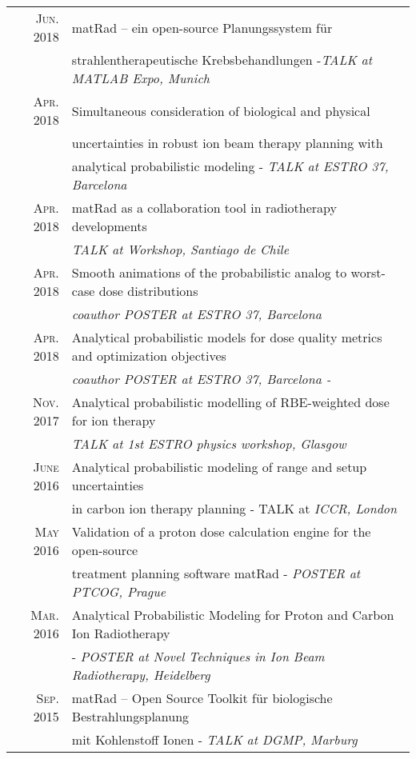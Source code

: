 \documentclass[a4paper,10pt]{article}
\begin{document}
\begin{tabular}{rl}
\textsc{Jun.} 2018 & matRad – ein open-source Planungssystem für \\
& strahlentherapeutische Krebsbehandlungen -\emph{TALK at MATLAB Expo, Munich} \\
\textsc{Apr.} 2018 & Simultaneous consideration of biological and physical \\
& uncertainties in robust ion beam therapy planning with  \\
& analytical probabilistic modeling  - \emph{TALK at ESTRO 37, Barcelona} \\
\textsc{Apr.} 2018 & matRad as a collaboration tool in radiotherapy developments\\
&   \emph{ TALK at Workshop, Santiago de Chile}\\
\textsc{Apr.} 2018 & Smooth animations of the probabilistic analog to worst-case dose distributions\\
&   \emph{coauthor POSTER at ESTRO 37, Barcelona}  \\
\textsc{Apr.} 2018 & Analytical probabilistic models for dose quality metrics and optimization objectives\\
&   \emph{coauthor POSTER at ESTRO 37, Barcelona - }  \\
\textsc{Nov.} 2017 & Analytical probabilistic modelling of RBE-weighted dose for ion therapy\\
&   \emph{TALK at 1st ESTRO physics workshop, Glasgow }  \\
\textsc{June} 2016 & Analytical probabilistic modeling of range and setup uncertainties\\
&  in carbon ion therapy planning  - TALK at \emph{ICCR, London}\\
\textsc{May} 2016 & Validation of a proton dose calculation engine for the open-source \\
& treatment planning software matRad -\emph{ POSTER at PTCOG, Prague}\\
\textsc{Mar.} 2016 & Analytical Probabilistic Modeling for Proton and Carbon Ion Radiotherapy \\
& - \emph{POSTER at Novel Techniques in Ion Beam Radiotherapy, Heidelberg}\\
\textsc{Sep.} 2015 & matRad – Open Source Toolkit für biologische Bestrahlungsplanung \\
&  mit Kohlenstoff Ionen - \emph{TALK at DGMP, Marburg}\\
\end{tabular}
\end{document}
